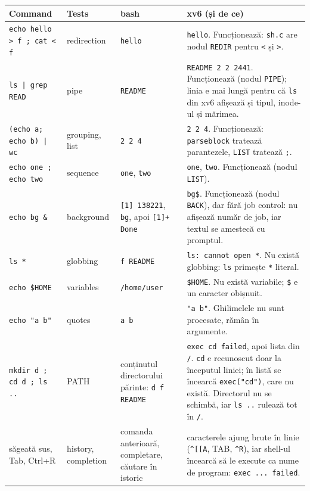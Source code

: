 \documentclass[12pt,a4paper]{article}
\begin{document}
{\small
\begin{longtable}{@{}>{\raggedright\arraybackslash}p{3.0cm}>{\raggedright\arraybackslash}p{2.0cm}>{\raggedright\arraybackslash}p{4.4cm}>{\raggedright\arraybackslash}p{5.2cm}@{}}
\toprule
\textbf{Command} & \textbf{Tests} & \textbf{bash} & \textbf{xv6 (și de ce)}\\
\midrule
\endhead
\texttt{echo hello > f ; cat < f} & redirection & \texttt{hello} & \texttt{hello}. Funcționează: \texttt{sh.c} are nodul \texttt{REDIR} pentru \texttt{<} și \texttt{>}.\\
\texttt{ls | grep READ} & pipe & \texttt{README} & \texttt{README 2 2 2441}. Funcționează (nodul \texttt{PIPE}); linia e mai lungă pentru că \texttt{ls} din xv6 afișează și tipul, inode-ul și mărimea.\\
\texttt{(echo a; echo b) | wc} & grouping, list & \texttt{2 2 4} & \texttt{2 2 4}. Funcționează: \texttt{parseblock} tratează parantezele, \texttt{LIST} tratează \texttt{;}.\\
\texttt{echo one ; echo two} & sequence & \texttt{one}, \texttt{two} & \texttt{one}, \texttt{two}. Funcționează (nodul \texttt{LIST}).\\
\texttt{echo bg \&} & background & \texttt{[1] 138221}, \texttt{bg}, apoi \texttt{[1]+ Done} & \texttt{bg\$}. Funcționează (nodul \texttt{BACK}), dar fără job control: nu afișează număr de job, iar textul se amestecă cu promptul.\\
\texttt{ls *} & globbing & \texttt{f README} & \texttt{ls: cannot open *}. Nu există globbing: \texttt{ls} primește \texttt{*} literal.\\
\texttt{echo \$HOME} & variables & \texttt{/home/user} & \texttt{\$HOME}. Nu există variabile; \texttt{\$} e un caracter obișnuit.\\
\texttt{echo "a b"} & quotes & \texttt{a b} & \texttt{"a b"}. Ghilimelele nu sunt procesate, rămân în argumente.\\
\texttt{mkdir d ; cd d ; ls ..} & PATH & conținutul directorului părinte: \texttt{d f README} & \texttt{exec cd failed}, apoi lista din \texttt{/}. \texttt{cd} e recunoscut doar la începutul liniei; în listă se încearcă \texttt{exec("cd")}, care nu există. Directorul nu se schimbă, iar \texttt{ls ..} rulează tot în \texttt{/}.\\
săgeată sus, Tab, Ctrl+R & history, completion & comanda anterioară, completare, căutare în istoric & caracterele ajung brute în linie (\texttt{\textasciicircum{}[[A}, TAB, \texttt{\textasciicircum{}R}), iar shell-ul încearcă să le execute ca nume de program: \texttt{exec ... failed}.\\
\bottomrule
\end{longtable}
}
\end{document}
